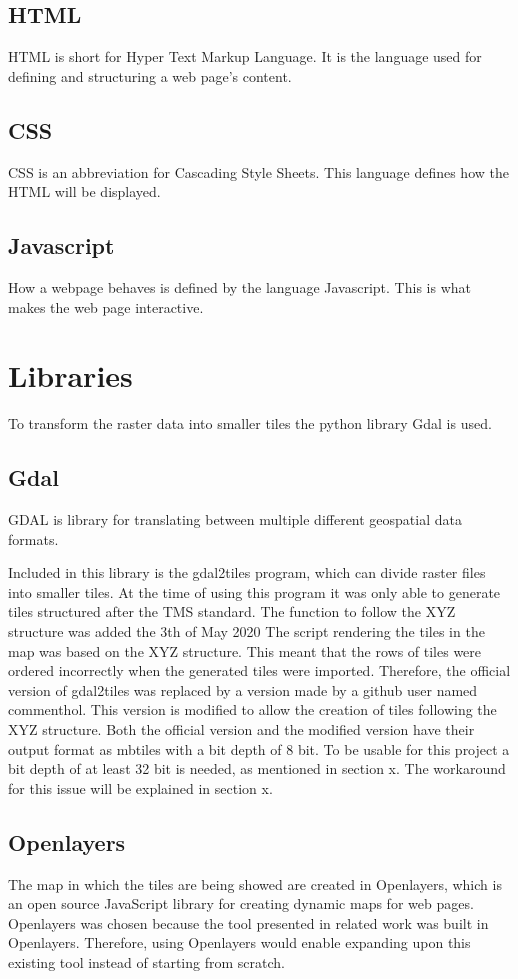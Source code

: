 \subsection*{HTML}
HTML is short for Hyper Text Markup Language. It is the language used for defining and structuring a web page’s content.
\subsection*{CSS}
CSS is an abbreviation for Cascading Style Sheets. This language defines how the HTML will be displayed.
\subsection*{Javascript}
How a webpage behaves is defined by the language Javascript.  This is what makes the web page interactive. 
\citep{WhatIsJs}

\section{Libraries}
To transform the raster data into smaller tiles the python library Gdal is used. 
\subsection*{Gdal}
GDAL is library for translating between multiple different geospatial data formats. \citep{GDAL} 

Included in this library is the gdal2tiles program, which can divide raster files into smaller tiles. 
At the time of using this program it was only able to generate tiles structured after the TMS standard. The function to follow the XYZ structure was added the 3th of May 2020 \citep{gdal2tilesDoc} \citep{GdalRelease}
%
The script rendering the tiles in the map was based on the XYZ structure. This meant that the rows of tiles were ordered incorrectly when the generated tiles were imported. Therefore, the official version of gdal2tiles was replaced by a version made by a github user named commenthol. This version is modified to allow the creation of tiles following the XYZ structure. \citep{gdalLeaflet}
Both the official version and the modified version have their output format as mbtiles with a bit depth of 8 bit. To be usable for this project a bit depth of at least 32 bit is needed, as mentioned in section x. The workaround for this issue will be explained in section x. 
\subsection*{Openlayers}
The map in which the tiles are being showed are created in Openlayers, which is an open source JavaScript library for creating dynamic maps for web pages. 
\citep{OL}
Openlayers was chosen because the tool presented in related work was built in Openlayers. Therefore, using Openlayers would enable expanding upon this existing tool instead of starting from scratch. 

